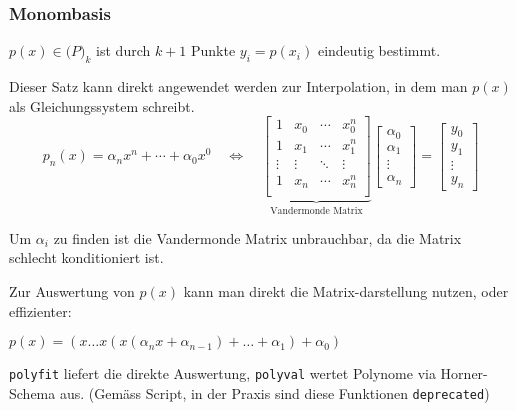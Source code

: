\subsubsection{Monombasis}

 $p(x) \in \mathcal(P)_k$ ist durch $k+1$ Punkte $y_i = p(x_i)$ eindeutig bestimmt.

Dieser Satz kann direkt angewendet werden zur Interpolation, in dem man $p(x)$ als Gleichungssystem schreibt.
$$
	p_n(x) = \alpha_n x^n + \cdots + \alpha_0 x^0 \quad \iff \quad
	\underbrace{
		\begin{bmatrix}
			1      & x_0    & \cdots & x_0^n  \\
			1      & x_1    & \cdots & x_1^n  \\
			\vdots & \vdots & \ddots & \vdots \\
			1      & x_n    & \cdots & x_n^n  \\
		\end{bmatrix}
	}_\text{Vandermonde Matrix}
	\begin{bmatrix}
		\alpha_0 \\
		\alpha_1 \\
		\vdots   \\
		\alpha_n
	\end{bmatrix}
	=
	\begin{bmatrix}
		y_0    \\
		y_1    \\
		\vdots \\
		y_n
	\end{bmatrix}
$$

Um $\alpha_i$ zu finden ist die Vandermonde Matrix unbrauchbar, da die Matrix schlecht konditioniert ist.

Zur Auswertung von $p(x)$ kann man direkt die Matrix-darstellung nutzen, oder effizienter:

 $p(x) = (x \ldots x ( x (\alpha_n x + \alpha_{n-1}) + \ldots + \alpha_1) + \alpha_0)$

 \verb|polyfit| liefert die direkte Auswertung, \verb|polyval| wertet Polynome via Horner-Schema aus. (Gemäss Script, in der Praxis sind diese Funktionen \verb|deprecated|)
